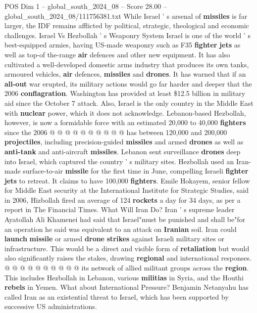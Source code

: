 \begin{textsample}{POS Dim 1 – global\_south\_2024\_08 – Score 28.00 – global\_south\_2024\_08/111756381.txt}
While Israel ' s arsenal of \textbf{missiles} is far larger, the IDF remains afflicted by political, strategic, theological and economic challenges.
Israel Vs Hezbollah ' s Weaponry System Israel is one of the world ' s best-equipped armies, having US-made weaponry such as F35 \textbf{fighter} \textbf{jets} as well as top-of the-range \textbf{air} defences and other new equipment.
It has also cultivated a well-developed domestic arms industry that produces its own tanks, armoured vehicles, \textbf{air} defences, \textbf{missiles} and \textbf{drones}.
It has warned that if an \textbf{all-out} war erupted, its military actions would go far harder and deeper that the 2006 \textbf{conflagration}.
Washington has provided at least \$12.5 billion in military aid since the October 7 attack.
Also, Israel is the only country in the Middle East with \textbf{nuclear} power, which it does not acknowledge.
Lebanon-based Hezbollah, however, is now a formidable force with an estimated 20,000 to 40,000 \textbf{fighters} since the 2006 @ @ @ @ @ @ @ @ @ @ has between 120,000 and 200,000 \textbf{projectiles}, including precision-guided \textbf{missiles} and armed \textbf{drones} as well as \textbf{anti-tank} and anti-aircraft \textbf{missiles}.
Lebanon sent surveillance \textbf{drones} deep into Israel, which captured the country ' s military sites.
Hezbollah used an Iran-made surface-to-air \textbf{missile} for the first time in June, compelling Israeli \textbf{fighter} \textbf{jets} to retreat.
It claims to have 100,000 \textbf{fighters}.
Emile Hokayem, senior fellow for Middle East security at the International Institute for Strategic Studies, said in 2006, Hizbollah fired an average of 124 \textbf{rockets} a day for 34 days, as per a report in The Financial Times.
What Will Iran Do?
Iran ' s supreme leader Ayatollah Ali Khamenei had said that Israel"must be punished and shall be"for an operation he said was equivalent to an attack on \textbf{Iranian} soil.
Iran could \textbf{launch} \textbf{missile} or armed \textbf{drone} \textbf{strikes} against Israeli military sites or infrastructure.
This would be a direct and visible form of \textbf{retaliation} but would also significantly raises the stakes, drawing \textbf{regional} and international responses. @ @ @ @ @ @ @ @ @ @ its network of allied militant groups across the \textbf{region}.
This includes Hezbollah in Lebanon, various \textbf{militias} in Syria, and the Houthi \textbf{rebels} in Yemen.
What about International Pressure?
Benjamin Netanyahu has called Iran as an existential threat to Israel, which has been supported by successive US administrations.

\end{textsample}
